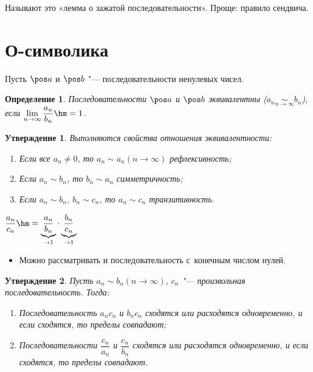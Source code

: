 \documentclass[a4paper,10pt,twoside]{article}
\newtheorem{Def}{Определение}[section]
\newtheorem{Ut}{Утверждение}[section]
\let\AVsection\section{}
\renewcommand\section{\newpage\scol\AVsection}
\newcommand{\scol}{  \renewcommand{\headrulewidth}{0.5pt}\fancyhead[RE,LO]{\thesection{} \leftmark} \fancyhead[LE,RO]{\thepage}}
\begin{document}
Называют это «лемма о зажатой последовательности». Проще: правило сендвича.
%


\section{О-символика}

Пусть $\pos a$ и $\pos b$ "--- последовательности ненулевых чисел.

\begin{Def}
    Последовательности $\pos a$ и $\pos b$ эквивалентны ($a_n\underset{n\to\infty}{\sim} b_n$),
     если $\lim\limits_{n\to\infty}\dfrac{a_n}{b_n}\hm=1$.
\end{Def}

\begin{Ut}
    Выполняются свойства отношения эквивалентности:

    \begin{enumerate}
        \item Если все $a_n\neq0$, то $a_n\sim a_n (n\to \infty)$ рефлексивность;

        \item Если $a_n\sim b_n$, то $b_n\sim a_n$ симметричность;

        \item Если $a_n\sim b_n,\ b_n\sim c_n$, то $a_n\sim c_n$ транзитивность.
    \end{enumerate}
\end{Ut}

$\dfrac{a_n}{c_n}\hm=\underbrace{\dfrac{a_n}{b_n}}_{\to1}
\cdot\underbrace{\dfrac{b_n}{c_n}}_{\to1}$
\begin{itemize}
\item Можно рассматривать и последовательность с~конечным числом нулей.
\end{itemize}
\begin{Ut}
    Пусть $a_n\sim b_n (n\to \infty)$, $c_n$ "--- произвольная последовательность. Тогда:

    \begin{enumerate}
        \item Последовательность $a_nc_n$ и $b_nc_n$ сходятся или расходятся одновременно, и если сходятся, то пределы совпадают;

        \item Последовательности $\dfrac{c_n}{a_n}$ и $\dfrac{c_n}{b_n}$ сходятся или расходятся одновременно, и если сходятся, то пределы совпадают.
    \end{enumerate}
\end{Ut}
\end{document}
